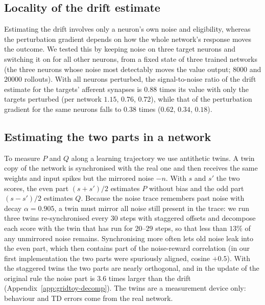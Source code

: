 \documentclass[10pt,twocolumn]{article}
\begin{document}
\subsection{Locality of the drift estimate}
\label{app:decomp-locality}
Estimating the drift involves only a neuron's own noise and eligibility, whereas the
perturbation gradient depends on how the whole network's response moves the
outcome. We tested this by keeping noise on three target neurons and switching it
on for all other neurons, from a fixed state of three trained networks (the three
neurons whose noise most detectably moves the value output; $8000$ and $20000$
rollouts). With all neurons perturbed, the signal-to-noise ratio of the drift
estimate for the targets' afferent synapses is $0.88$ times its value with only the
targets perturbed (per network $1.15$, $0.76$, $0.72$), while that of the
perturbation gradient for the same neurons falls to $0.38$ times ($0.62$, $0.34$,
$0.18$).

\subsection{Estimating the two parts in a network}
\label{app:decomp-twin}
To measure $P$ and $Q$ along a learning trajectory we use antithetic twins.
A twin copy of the network is synchronised with the real one and then receives the
same weights and input spikes but the mirrored noise $-n$. With $s$ and $s'$ the
two scores, the even part $(s+s')/2$ estimates $P$ without bias and the odd part
$(s-s')/2$ estimates $Q$. Because the noise trace remembers past noise with decay
$\alpha=0.905$, a twin must mirror all noise still present in the trace: we run
three twins re-synchronised every $30$ steps with staggered offsets and decompose
each score with the twin that has run for $20$--$29$ steps, so that less than
$13\%$ of any unmirrored noise remains. Synchronising more often lets old noise
leak into the even part, which then contains part of the noise-reward
correlation (in our first implementation the two parts were spuriously aligned,
cosine $+0.5$). With the staggered twins the two parts are nearly orthogonal, and in
the update of the original rule the noise part is $3.6$ times larger than the drift
(Appendix~\ref{app:gridtoy-decomp}). The twins are a measurement device only:
behaviour and TD errors come from the real network.
\end{document}
